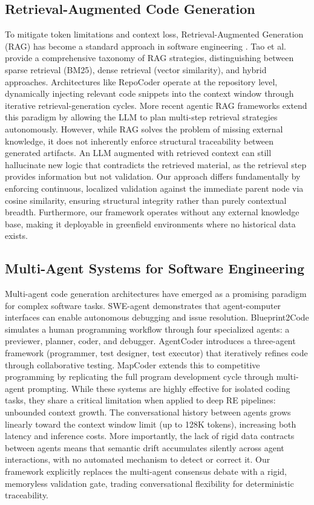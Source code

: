 \documentclass[journal]{IEEEtran}
\begin{document}
\subsection{Retrieval-Augmented Code Generation}
To mitigate token limitations and context loss, Retrieval-Augmented Generation (RAG) has become a standard approach in software engineering \cite{rag_code_survey2025}. Tao et al. provide a comprehensive taxonomy of RAG strategies, distinguishing between sparse retrieval (BM25), dense retrieval (vector similarity), and hybrid approaches. Architectures like RepoCoder \cite{repocoder2023} operate at the repository level, dynamically injecting relevant code snippets into the context window through iterative retrieval-generation cycles. More recent agentic RAG frameworks extend this paradigm by allowing the LLM to plan multi-step retrieval strategies autonomously. However, while RAG solves the problem of missing external knowledge, it does not inherently enforce structural traceability between generated artifacts. An LLM augmented with retrieved context can still hallucinate new logic that contradicts the retrieved material, as the retrieval step provides information but not validation. Our approach differs fundamentally by enforcing continuous, localized validation against the immediate parent node via cosine similarity, ensuring structural integrity rather than purely contextual breadth. Furthermore, our framework operates without any external knowledge base, making it deployable in greenfield environments where no historical data exists.

\subsection{Multi-Agent Systems for Software Engineering}
Multi-agent code generation architectures have emerged as a promising paradigm for complex software tasks. SWE-agent \cite{swe_agent2024} demonstrates that agent-computer interfaces can enable autonomous debugging and issue resolution. Blueprint2Code \cite{blueprint2code2025} simulates a human programming workflow through four specialized agents: a previewer, planner, coder, and debugger. AgentCoder \cite{agentcoder2023} introduces a three-agent framework (programmer, test designer, test executor) that iteratively refines code through collaborative testing. MapCoder \cite{mapcoder2024} extends this to competitive programming by replicating the full program development cycle through multi-agent prompting. While these systems are highly effective for isolated coding tasks, they share a critical limitation when applied to deep RE pipelines: unbounded context growth. The conversational history between agents grows linearly toward the context window limit (up to 128K tokens), increasing both latency and inference costs. More importantly, the lack of rigid data contracts between agents means that semantic drift accumulates silently across agent interactions, with no automated mechanism to detect or correct it. Our framework explicitly replaces the multi-agent consensus debate with a rigid, memoryless validation gate, trading conversational flexibility for deterministic traceability.
\end{document}
